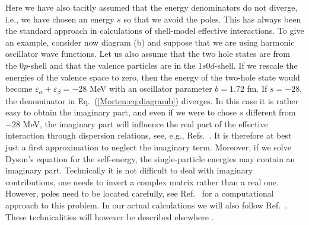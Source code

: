 Here we have also tacitly assumed that the energy denominators do not
diverge, i.e., we have chosen an energy $s$ so that we avoid the
poles. This has always been the standard approach in calculations of
shell-model effective interactions. To give an example, consider now
diagram (b) and suppose that we are using harmonic oscillator wave
functions. Let us also assume that the two hole states are from the
$0p$-shell and that the valence particles are in the $1s0d$-shell. If
we rescale the energies of the valence space to zero, then the energy of the
two-hole state would become $\varepsilon_\alpha+\varepsilon_\beta=-28$ MeV with
an oscillator parameter $b=1.72$ fm. If $s=-28$, the denominator in 
Eq.~(\ref{Morten:eq:diagramb}) 
diverges.  In this case it is rather easy to obtain the imaginary
part, and even if we were to chose $s$ different from $-28$ MeV, the
imaginary part will influence the real part of the effective
interaction through dispersion relations, see, e.g.,
Refs.~.  It is
therefore at best just a first approximation to neglect the imaginary
term.  Moreover, if we solve Dyson's equation for the self-energy, the
single-particle energies may contain an imaginary part.  Technically
it is  not difficult to deal with imaginary contributions, one
needs to invert a complex matrix rather than a real one.  However,
poles need to be located carefully,
see
Ref.~ for a computational approach to this
problem. In our actual calculations we will also follow
Ref.~. These technicalities will however be
described elsewhere \cite{Morten:mhj99}.

